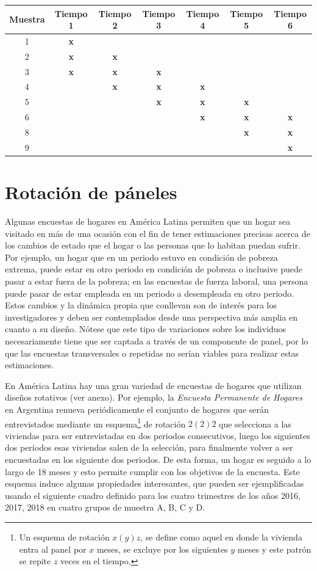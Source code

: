 \documentclass[
  12pt,
  spanish,
]{book}
\begin{document}
\begin{longtable}[]{@{}ccccccc@{}}
\toprule
Muestra & Tiempo 1 & Tiempo 2 & Tiempo 3 & Tiempo 4 & Tiempo 5 & Tiempo 6 \\
\midrule
\endhead
1 & \textbf{x} & & & & & \\
2 & \textbf{x} & \textbf{x} & & & & \\
3 & \textbf{x} & \textbf{x} & \textbf{x} & & & \\
4 & & \textbf{x} & \textbf{x} & \textbf{x} & & \\
5 & & & \textbf{x} & \textbf{x} & \textbf{x} & \\
6 & & & & \textbf{x} & \textbf{x} & \textbf{x} \\
8 & & & & & \textbf{x} & \textbf{x} \\
9 & & & & & & \textbf{x} \\
\bottomrule
\end{longtable}

\hypertarget{rotaciuxf3n-de-puxe1neles}{%
\section{Rotación de páneles}\label{rotaciuxf3n-de-puxe1neles}}

Algunas encuestas de hogares en América Latina permiten que un hogar sea visitado en más de una ocasión con el fin de tener estimaciones precisas acerca de los cambios de estado que el hogar o las personas que lo habitan puedan sufrir. Por ejemplo, un hogar que en un periodo estuvo en condición de pobreza extrema, puede estar en otro periodo en condición de pobreza o inclusive puede pasar a estar fuera de la pobreza; en las encuestas de fuerza laboral, una persona puede pasar de estar empleada en un periodo a desempleada en otro periodo. Estos cambios y la dinámica propia que conllevan son de interés para los investigadores y deben ser contemplados desde una perspectiva más amplia en cuanto a su diseño. Nótese que este tipo de variaciones sobre los individuos necesariamente tiene que ser captada a través de un componente de panel, por lo que las encuestas transversales o repetidas no serían viables para realizar estas estimaciones.

En América Latina hay una gran variedad de encuestas de hogares que utilizan diseños rotativos (ver anexo). Por ejemplo, la \emph{Encuesta Permanente de Hogares} en Argentina renueva periódicamente el conjunto de hogares que serán entrevistados mediante un esquema\footnote{Un esquema de rotación \(x(y)z\), se define como aquel en donde la vivienda entra al panel por \(x\) meses, se excluye por los siguientes \(y\) meses y este patrón se repite \(z\) veces en el tiempo.} de rotación \(2(2)2\) que selecciona a las viviendas para ser entrevistadas en dos periodos consecutivos, luego los siguientes dos periodos esas viviendas salen de la selección, para finalmente volver a ser encuestadas en los siguiente dos periodos. De esta forma, un hogar es seguido a lo largo de 18 meses y esto permite cumplir con los objetivos de la encuesta. Este esquema induce algunas propiedades interesantes, que pueden ser ejemplificadas usando el siguiente cuadro definido para los cuatro trimestres de los años 2016, 2017, 2018 en cuatro grupos de muestra A, B, C y D.
\end{document}
